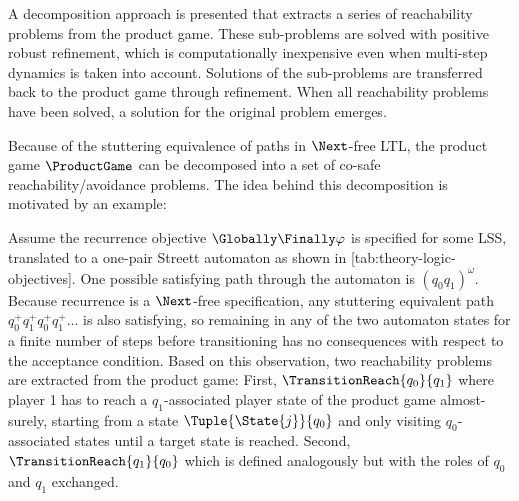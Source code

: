 A decomposition approach is presented that extracts a series of reachability problems from the product game.
These sub-problems are solved with positive robust refinement, which is computationally inexpensive even when multi-step dynamics is taken into account.
Solutions of the sub-problems are transferred back to the product game through refinement.
When all reachability problems have been solved, a solution for the original problem emerges.


\startsubsection[title={Transition-based Reachability Decomposition},reference=sec:refinement-transition-decomposition]

    Because of the stuttering equivalence of paths in $\Next$-free LTL, the product game $\ProductGame$ can be decomposed into a set of co-safe reachability/avoidance problems.
    The idea behind this decomposition is motivated by an example:

    Assume the recurrence objective $\Globally \Finally \varphi$ is specified for some LSS, translated to a one-pair Streett automaton as shown in [tab:theory-logic-objectives].
    One possible satisfying path through the automaton is $(q_0 q_1)^\omega$.
    Because recurrence is a $\Next$-free specification, any stuttering equivalent path $q_0^+ q_1^+ q_0^+ q_1^+ ...$ is also satisfying, so remaining in any of the two automaton states for a finite number of steps before transitioning has no consequences with respect to the acceptance condition.
    Based on this observation, two reachability problems are extracted from the product game:
    First, $\TransitionReach{q_0}{q_1}$ where player 1 has to reach a $q_1$-associated player state of the product game almost-surely, starting from a state $\Tuple{\State{j}}{q_0}$ and only visiting $q_0$-associated states until a target state is reached.
    Second, $\TransitionReach{q_1}{q_0}$ which is defined analogously but with the roles of $q_0$ and $q_1$ exchanged.
    
